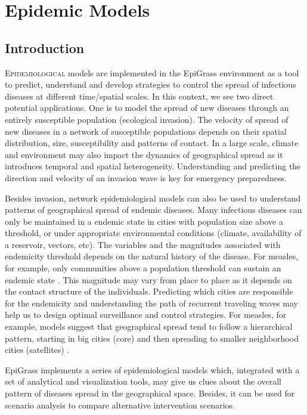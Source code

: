 \chapter{Epidemic Models}   \label{cap:modeling}

\section{Introduction}
\lettrine{E}{pidemiological} models are implemented in the EpiGrass environment as a tool to predict, understand and develop strategies to control the spread of infectious diseases at different time/spatial scales. In this context, we see two direct potential applications. One is to model the spread of new diseases through an entirely susceptible population (ecological invasion). The velocity of spread of new diseases in a network of susceptible populations depends on their spatial distribution, size, susceptibility and patterns of contact. In a large scale, climate and environment may also impact the dynamics of geographical spread as it introduces temporal and spatial heterogeneity. Understanding and predicting the direction and velocity of an invasion wave is key for emergency preparedness. 

Besides invasion, network epidemiological models can also be used to understand patterns of geographical spread of endemic diseases. Many infectious diseases can only be maintained in a endemic state in cities with population size above a threshold, or under appropriate environmental conditions (climate, availability of a reservoir, vectors, etc). The variables and the magnitudes associated with endemicity threshold depends on the natural history of the disease. For measles, for example, only communities above a population threshold can sustain an endemic state \cite{MJKeelingandBTGrenfell1997}. This magnitude may vary from place to place as it depends on the contact structure of the individuals. Predicting which cities are responsible for the endemicity and understanding the path of recurrent traveling waves may help us to design optimal surveillance and control strategies. For measles, for example, models suggest that geographical spread tend to follow a hierarchical pattern, starting in big cities (core) and then spreading to smaller neighborhood cities (satellites) \cite{BTGrenfellandONBjoernstadandJKappey2001}. 

EpiGrass implements a series of epidemiological models which, integrated with a set of analytical and visualization tools,  may give us clues about the overall pattern of diseases spread in the geographical space. Besides, it can be used for scenario analysis to compare alternative intervention scenarios. 

